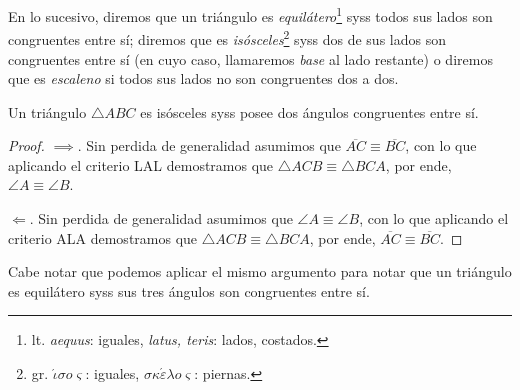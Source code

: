 \documentclass[11pt,a4paper]{book}
\begin{document}
\begin{mydef}
En lo sucesivo, diremos que un triángulo es \textit{equilátero}\footnote{lt. \textit{aequus}: iguales, \textit{latus, teris}: lados, costados.} syss todos sus lados son congruentes entre sí; diremos que es \textit{isósceles}\footnote{gr. $\acute{\iota}\sigma o\varsigma$: iguales, $\sigma\kappa\acute{\varepsilon}\lambda o\varsigma$: piernas.} syss dos de sus lados son congruentes entre sí (en cuyo caso, llamaremos \textit{base} al lado restante) o diremos que es \textit{escaleno} si todos sus lados no son congruentes dos a dos.
\end{mydef}
\begin{thm}
Un triángulo $\triangle ABC$ es isósceles syss posee dos ángulos congruentes entre sí.
\end{thm}
\begin{proof}
$\implies$. Sin perdida de generalidad asumimos que $\overline{AC}\equiv\overline{BC}$, con lo que aplicando el criterio LAL demostramos que $\triangle ACB\equiv\triangle BCA$, por ende, $\angle A\equiv\angle B$.

$\Longleftarrow$. Sin perdida de generalidad asumimos que $\angle A\equiv\angle B$, con lo que aplicando el criterio ALA demostramos que $\triangle ACB\equiv\triangle BCA$, por ende, $\overline{AC}\equiv\overline{BC}$.
\end{proof}
Cabe notar que podemos aplicar el mismo argumento para notar que un triángulo es equilátero syss sus tres ángulos son congruentes entre sí.
\end{document}
